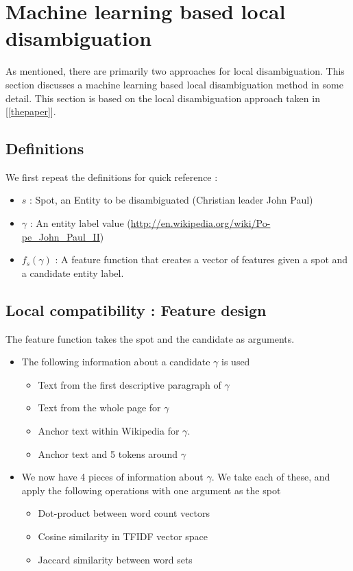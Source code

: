 \section{Machine learning based local disambiguation}
As mentioned, there are primarily two approaches for local disambiguation. 
This section discusses a machine learning based local disambiguation method in some detail. This section
is based on the local disambiguation approach taken in [\ref{thepaper}].
\subsection{Definitions}
We first repeat the definitions for quick reference : 
\begin{itemize}
  \item $s$ : Spot, an Entity to be disambiguated (Christian leader John Paul) \bigskip 
  \item $\gamma$ : An entity label value (\url{http://en.wikipedia.org/wiki/Po-pe_John_Paul_II})  \bigskip 
 \item $f_s(\gamma)$ : A feature function that creates a vector of features given a spot and a candidate entity label.
 \end{itemize}
 
 \subsection{Local compatibility : Feature design} 
 The feature function takes the spot and the candidate as arguments. 
 
\begin{itemize} 
 
 \item The following information about a candidate $\gamma$ is used
\begin{itemize} 
 \item Text from the first descriptive paragraph of $\gamma$
  \item Text from the whole page for $\gamma$
  \item Anchor text within Wikipedia for $\gamma$.
  \item Anchor text and 5 tokens around $\gamma$ 
 \end{itemize}
 
 \item We now have 4 pieces of information about $\gamma$. We take each of these, and apply the following operations with 
 one argument as the spot
    \begin{itemize}
      \item{Dot-product between word count vectors}
      \item{Cosine similarity in TFIDF vector space}
      \item{Jaccard similarity between word sets}
  \end{itemize} 
  \end{itemize} 
 
